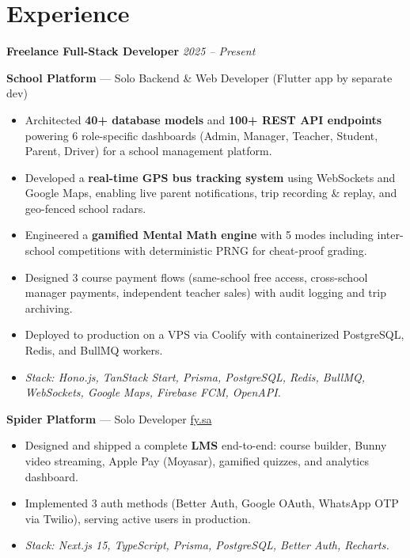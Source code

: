\documentclass[10pt, letterpaper]{article}
\newenvironment{highlights}{
    \begin{itemize}[
        topsep=0.08cm,
        parsep=0.08cm,
        partopsep=0pt,
        itemsep=0pt,
        leftmargin=10pt
    ]
}{
    \end{itemize}
}
\begin{document}
\section{Experience}

\textbf{Freelance Full-Stack Developer} \hfill \textit{2025 -- Present}

\vspace{0.08cm}

\textbf{School Platform} — Solo Backend \& Web Developer (Flutter app by separate dev)
\begin{highlights}
    \item Architected \textbf{40+ database models} and \textbf{100+ REST API endpoints} powering 6 role-specific dashboards (Admin, Manager, Teacher, Student, Parent, Driver) for a school management platform.
    \item Developed a \textbf{real-time GPS bus tracking system} using WebSockets and Google Maps, enabling live parent notifications, trip recording \& replay, and geo-fenced school radars.
    \item Engineered a \textbf{gamified Mental Math engine} with 5 modes including inter-school competitions with deterministic PRNG for cheat-proof grading.
    \item Designed 3 course payment flows (same-school free access, cross-school manager payments, independent teacher sales) with audit logging and trip archiving.
    \item Deployed to production on a VPS via Coolify with containerized PostgreSQL, Redis, and BullMQ workers.
    \item \textit{Stack: Hono.js, TanStack Start, Prisma, PostgreSQL, Redis, BullMQ, WebSockets, Google Maps, Firebase FCM, OpenAPI.}
\end{highlights}

\vspace{0.15cm}

\textbf{Spider Platform} — Solo Developer \hfill \href{https://fy.sa}{fy.sa}
\begin{highlights}
    \item Designed and shipped a complete \textbf{LMS} end-to-end: course builder, Bunny video streaming, Apple Pay (Moyasar), gamified quizzes, and analytics dashboard.
    \item Implemented 3 auth methods (Better Auth, Google OAuth, WhatsApp OTP via Twilio), serving active users in production.
    \item \textit{Stack: Next.js 15, TypeScript, Prisma, PostgreSQL, Better Auth, Recharts.}
\end{highlights}
\end{document}
